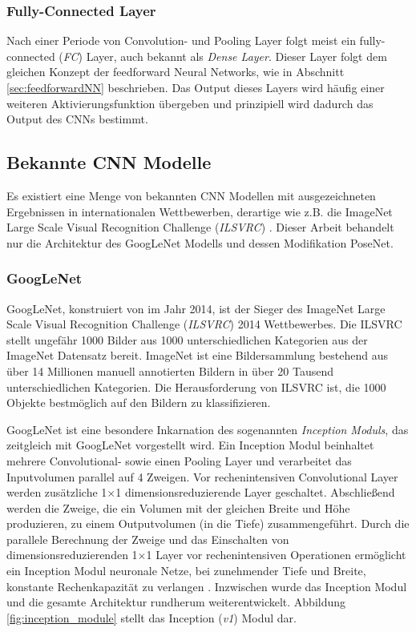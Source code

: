 \subsubsection{Fully-Connected Layer}
Nach einer Periode von Convolution- und Pooling Layer folgt meist ein fully-connected (\textit{FC}) Layer, auch bekannt als \textit{Dense Layer}. Dieser Layer folgt dem gleichen Konzept der feedforward Neural Networks, wie in Abschnitt \ref{sec:feedforwardNN} beschrieben. Das Output dieses Layers wird häufig einer weiteren Aktivierungsfunktion übergeben \cite{yamashitaConvolutionalNeuralNetworks2018} und prinzipiell wird dadurch das Output des CNNs bestimmt.

\subsection{Bekannte CNN Modelle}
Es existiert eine Menge von bekannten CNN Modellen mit ausgezeichneten Ergebnissen in internationalen Wettbewerben, derartige wie z.B. die ImageNet Large Scale Visual Recognition Challenge (\textit{ILSVRC}) \cite{russakovskyImageNetLargeScale2015}. Dieser Arbeit behandelt nur die Architektur des GoogLeNet Modells und dessen Modifikation PoseNet.

\subsubsection{GoogLeNet}
\label{sec:googlenet}
GoogLeNet, konstruiert von \citet{szegedyGoingDeeperConvolutions2015} im Jahr 2014, ist der Sieger des ImageNet Large Scale Visual Recognition Challenge (\textit{ILSVRC}) 2014 Wettbewerbes. Die ILSVRC stellt ungefähr 1000 Bilder aus 1000 unterschiedlichen Kategorien aus der ImageNet Datensatz bereit. ImageNet ist eine Bildersammlung bestehend aus über 14 Millionen manuell annotierten Bildern in über 20 Tausend unterschiedlichen Kategorien. Die Herausforderung von ILSVRC ist, die 1000 Objekte bestmöglich auf den Bildern zu klassifizieren.

GoogLeNet ist eine besondere Inkarnation des sogenannten\textit{ Inception Moduls}, das zeitgleich mit GoogLeNet vorgestellt wird.
Ein Inception Modul beinhaltet mehrere Convolutional- sowie einen Pooling Layer und verarbeitet das Inputvolumen parallel auf 4 Zweigen. Vor rechenintensiven Convolutional Layer werden zusätzliche 1$\times$1 dimensionsreduzierende Layer geschaltet. Abschließend werden die Zweige, die ein Volumen mit der gleichen Breite und Höhe produzieren, zu einem Outputvolumen (in die Tiefe) zusammengeführt.  Durch die parallele Berechnung der Zweige und das Einschalten von dimensionsreduzierenden 1$\times$1 Layer vor rechenintensiven Operationen ermöglicht ein Inception Modul neuronale Netze, bei zunehmender Tiefe und Breite, konstante Rechenkapazität zu verlangen \cite{szegedyGoingDeeperConvolutions2015}.
Inzwischen wurde das Inception Modul \cite{szegedyRethinkingInceptionArchitecture2016} und die gesamte Architektur rundherum \cite{szegedyInceptionv4InceptionResNetImpact2016} weiterentwickelt. Abbildung \ref{fig:inception_module} stellt das Inception (\textit{v1}) Modul dar.


